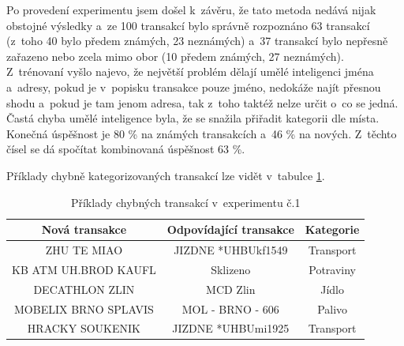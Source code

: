 Po provedení experimentu jsem došel k~závěru, že tato metoda nedává nijak obstojné výsledky a~ze 100 transakcí bylo správně rozpoznáno 63 transakcí (z~toho 40 bylo předem známých, 23 neznámých) a~37 transakcí bylo nepřesně zařazeno nebo zcela mimo obor (10 předem známých, 27 neznámých). Z~trénovaní vyšlo najevo, že největší problém dělají umělé inteligenci jména a~adresy, pokud je v~popisku transakce pouze jméno, nedokáže najít přesnou shodu a~pokud je tam jenom adresa, tak z~toho taktéž nelze určit o~co se jedná. Častá chyba umělé inteligence byla, že se snažila přiřadit kategorii dle místa.
Konečná úspěšnost je 80 \% na známých transakcích a~46 \% na nových. Z~těchto čísel se dá spočítat kombinovaná úspěšnost 63 \%.

Příklady chybně kategorizovaných transakcí lze vidět v~tabulce \ref{tab:exp1}.

\begin{center}
\begin{table}[h]
\centering
\begin{tabular}{ |c| c| c| }
\hline
\textbf{Nová transakce} & \textbf{Odpovídající transakce}  & \textbf{Kategorie} \\  
\hline
ZHU TE MIAO & JIZDNE   *UHBUkf1549 & Transport \\ 
\hline
KB ATM UH.BROD KAUFL & Sklizeno & Potraviny  \\ 
\hline
DECATHLON ZLIN & MCD Zlin & Jídlo  \\  
\hline
MOBELIX BRNO SPLAVIS & MOL - BRNO - 606 & Palivo  \\
\hline
HRACKY SOUKENIK & JIZDNE   *UHBUmi1925 & Transport  \\
\hline
\end{tabular}
\caption{Příklady chybných transakcí v~experimentu č.1}
\label{tab:exp1}
\end{table}
\end{center}

